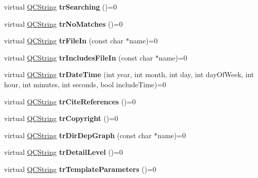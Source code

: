 \begin{DoxyCompactItemize}
virtual \mbox{\hyperlink{class_q_c_string}{Q\+C\+String}} {\bfseries tr\+Searching} ()=0
\item 
\mbox{\label{class_translator_a7c29a8b20c38ea5a2195bef0864bd21f}} 
virtual \mbox{\hyperlink{class_q_c_string}{Q\+C\+String}} {\bfseries tr\+No\+Matches} ()=0
\item 
\mbox{\label{class_translator_a07ebbeefa44a421f3c2ab0f1c01b88db}} 
virtual \mbox{\hyperlink{class_q_c_string}{Q\+C\+String}} {\bfseries tr\+File\+In} (const char $\ast$name)=0
\item 
\mbox{\label{class_translator_a671ab8974160728018662ded67ebf16b}} 
virtual \mbox{\hyperlink{class_q_c_string}{Q\+C\+String}} {\bfseries tr\+Includes\+File\+In} (const char $\ast$name)=0
\item 
\mbox{\label{class_translator_aa96be72c23a1d2139b068552e3a539c4}} 
virtual \mbox{\hyperlink{class_q_c_string}{Q\+C\+String}} {\bfseries tr\+Date\+Time} (int year, int month, int day, int day\+Of\+Week, int hour, int minutes, int seconds, bool include\+Time)=0
\item 
\mbox{\label{class_translator_a3a5e754a2583632dfe5d49a1f7dd5b74}} 
virtual \mbox{\hyperlink{class_q_c_string}{Q\+C\+String}} {\bfseries tr\+Cite\+References} ()=0
\item 
\mbox{\label{class_translator_a9bef11a773c5cf0878f4d833b78df577}} 
virtual \mbox{\hyperlink{class_q_c_string}{Q\+C\+String}} {\bfseries tr\+Copyright} ()=0
\item 
\mbox{\label{class_translator_a70a64be40e7f153362b76feaa1fb0b19}} 
virtual \mbox{\hyperlink{class_q_c_string}{Q\+C\+String}} {\bfseries tr\+Dir\+Dep\+Graph} (const char $\ast$name)=0
\item 
\mbox{\label{class_translator_ae7fe2488d7ab8950d24415d95d22bc80}} 
virtual \mbox{\hyperlink{class_q_c_string}{Q\+C\+String}} {\bfseries tr\+Detail\+Level} ()=0
\item 
\mbox{\label{class_translator_aad2e6bdd6f4e8d2b1eba09ff00c6db2e}} 
virtual \mbox{\hyperlink{class_q_c_string}{Q\+C\+String}} {\bfseries tr\+Template\+Parameters} ()=0

\end{DoxyCompactItemize}
